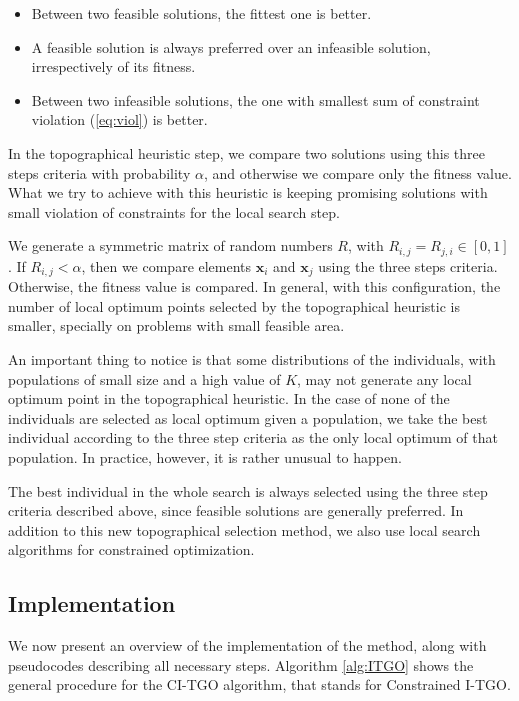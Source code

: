 \begin{itemize}

\item Between two feasible solutions, the fittest one is better.

\item A feasible solution is always preferred over an infeasible solution, irrespectively of its fitness.

\item Between two infeasible solutions, the one with smallest sum of constraint violation (\ref{eq:viol}) is better.

\end{itemize}


In the topographical heuristic step, we compare two solutions using this three steps criteria with probability $\alpha$, and otherwise we compare only the fitness value. What we try to achieve with this heuristic is keeping promising solutions with small violation of constraints for the local search step.

We generate a symmetric matrix of random numbers $R$, with $R_{i, j} = R_{j, i} \in [0, 1]$. If $R_{i, j} < \alpha$, then we compare elements $\bm{x}_i$ and $\bm{x}_j$ using the three steps criteria. Otherwise, the fitness value is compared. In general, with this configuration, the number of local optimum points selected by the topographical heuristic is smaller, specially on problems with small feasible area. 

An important thing to notice is that some distributions of the individuals, with populations of small size and a high value of $K$, may not generate any local optimum point in the topographical heuristic. In the case of none of the individuals are selected as local optimum given a population, we take the best individual according to the three step criteria as the only local optimum of that population. In practice, however, it is rather unusual to happen.

The best individual in the whole search is always selected using the three step criteria described above, since  feasible solutions are generally preferred. In addition to this new topographical selection method, we also use local search algorithms for constrained optimization.


\subsection{Implementation}

We now present an overview of the implementation of the method, along with pseudocodes describing all necessary steps. Algorithm \ref{alg:ITGO} shows the general procedure for the CI-TGO algorithm, that stands for Constrained I-TGO. 

